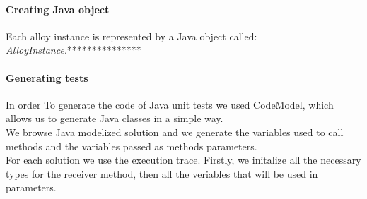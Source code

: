 \paragraph{Creating Java object}
Each alloy instance is represented by a Java object called: \textit{AlloyInstance}.***************

\paragraph{Generating tests}
In order To generate the code of Java unit tests we used CodeModel, which allows us to generate Java classes in a simple way.\\
We browse Java modelized solution and we generate the variables used to call methods and the variables passed as methods parameters.\\
For each solution we use the execution trace.
Firstly, we initalize all the necessary types for the receiver method, then all the veriables that will be used in parameters.

